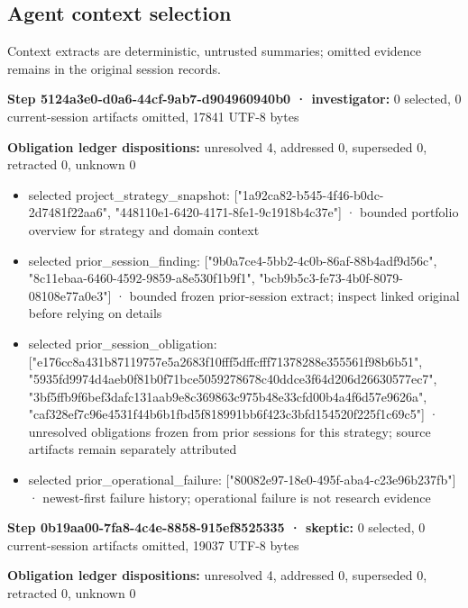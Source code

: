 \documentclass[11pt]{article}
\begin{document}
\subsection{Agent context selection}
Context extracts are deterministic, untrusted summaries; omitted evidence remains in the original session records.\par
\textbf{Step 5124a3e0-d0a6-44cf-9ab7-d904960940b0 · investigator:} 0 selected, 0 current-session artifacts omitted, 17841 UTF-8 bytes\par
\textbf{Obligation ledger dispositions:} unresolved 4, addressed 0, superseded 0, retracted 0, unknown 0\par
\begin{itemize}
\item selected project\_strategy\_snapshot: ["1a92ca82-b545-4f46-b0dc-2d7481f22aa6", "448110e1-6420-4171-8fe1-9c1918b4c37e"] · bounded portfolio overview for strategy and domain context
\item selected prior\_session\_finding: ["9b0a7ce4-5bb2-4c0b-86af-88b4adf9d56c", "8c11ebaa-6460-4592-9859-a8e530f1b9f1", "bcb9b5c3-fe73-4b0f-8079-08108e77a0e3"] · bounded frozen prior-session extract; inspect linked original before relying on details
\item selected prior\_session\_obligation: ["e176cc8a431b87119757e5a2683f10fff5dffcfff71378288e355561f98b6b51", "5935fd9974d4aeb0f81b0f71bce5059278678c40ddce3f64d206d26630577ec7", "3bf5ffb9f6bef3dafc131aab9e8c369863c975b48e33cfd00b4a4f6d57e9626a", "caf328ef7c96e4531f44b6b1fbd5f818991bb6f423c3bfd154520f225f1c69c5"] · unresolved obligations frozen from prior sessions for this strategy; source artifacts remain separately attributed
\item selected prior\_operational\_failure: ["80082e97-18e0-495f-aba4-c23e96b237fb"] · newest-first failure history; operational failure is not research evidence
\end{itemize}
\textbf{Step 0b19aa00-7fa8-4c4e-8858-915ef8525335 · skeptic:} 0 selected, 0 current-session artifacts omitted, 19037 UTF-8 bytes\par
\textbf{Obligation ledger dispositions:} unresolved 4, addressed 0, superseded 0, retracted 0, unknown 0\par
\end{document}

